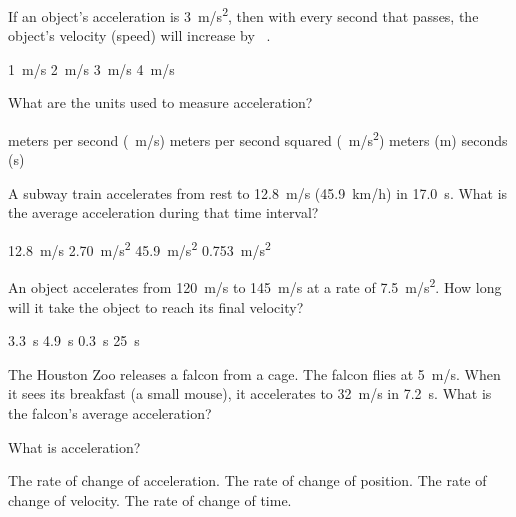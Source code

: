 \documentclass[../main-physics-problems.tex]{subfiles}
\begin{document}
\begin{questions}





\question
If an object's acceleration is \SI{3}{m/s^2}, then with every second that passes, the object's velocity (speed) will increase by \fillin[][2cm]\ .

\begin{choices}
    \choice \SI{1}{m/s}
    \choice \SI{2}{m/s}
    \correctchoice \SI{3}{m/s}
    \choice \SI{4}{m/s}
\end{choices}



\question
What are the units used to measure acceleration?

\begin{choices}
    \choice meters per second (\SI{}{m/s})
    \correctchoice meters per second squared (\SI{}{m/s^2})
    \choice meters (m)
    \choice seconds (s)
\end{choices}


\question %
A subway train accelerates from rest to \SI{12.8}{m/s} (\SI{45.9}{km/h}) in \SI{17.0}{s}. What is the average acceleration during that time interval?

\begin{choices}
\choice \SI{12.8}{m/s}
\choice \SI{2.70}{m/s^2}
\choice \SI{45.9}{m/s^2}
\CorrectChoice \SI{0.753}{m/s^2} 
\end{choices}




\question
An object accelerates from \SI{120}{m/s} to \SI{145}{m/s} at a rate of \SI{7.5}{m/s^2}. How long will it take the object to reach its final velocity?

\begin{choices}
    \correctchoice \SI{3.3}{s}
    \choice \SI{4.9}{s}
    \choice \SI{0.3}{s}
    \choice \SI{25}{s}
\end{choices}


\question
The Houston Zoo releases a falcon from a cage. The falcon flies at \SI{5}{m/s}. When it sees its breakfast (a small mouse), it accelerates to \SI{32}{m/s} in \SI{7.2}{s}. What is the falcon's average acceleration?



\question
What is acceleration?

\begin{choices}
\choice The rate of change of acceleration.
\choice The rate of change of position. 
\CorrectChoice The rate of change of velocity.
\choice The rate of change of time.
\end{choices}


\end{questions}
\end{document}
